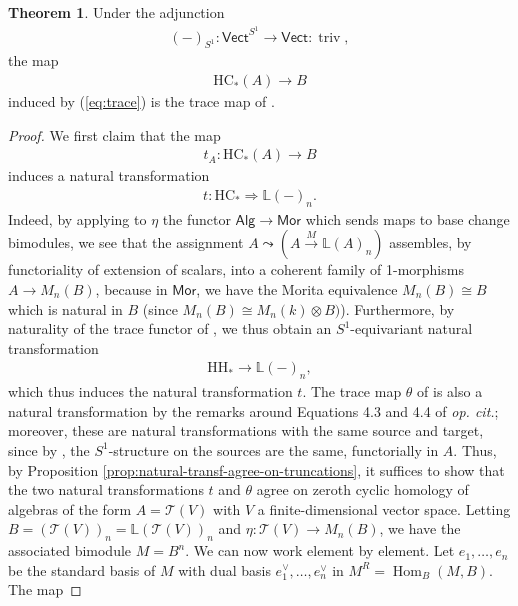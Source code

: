 \documentclass{article}
\numberwithin{equation}{section}
\theoremstyle{quest}
\theoremstyle{definition}
\newtheorem{thm}{Theorem}[section]
\theoremstyle{remark}
\DeclareMathOperator{\Hom}{Hom}
\DeclareMathOperator{\triv}{triv}
\begin{document}
\begin{thm}\label{thm:trace}
	Under the adjunction 
	\begin{align*}
		(-)_{S^1}: \mathsf{Vect}^{S^1}\to \mathsf{Vect}:\triv,
	\end{align*} 
	the map
	\begin{align*}
		\mathrm{HC}_*(A)\to B
	\end{align*} 
	induced by (\ref{eq:trace}) is the trace map of \cite{BKR}.
\end{thm} 
\begin{proof}
	We first claim that the map 
	\begin{align*}
		t_A:\mathrm{HC}_*(A)\to B
	\end{align*} 
	induces a natural transformation
	\begin{align*}
		t:\mathrm{HC}_*\Rightarrow \mathbb{L}(-)_n.
	\end{align*} 
	Indeed, by applying to $\eta$ the functor $\mathsf{Alg}\to \mathsf{Mor}$ which sends maps to base change bimodules, we see that the assignment $A\leadsto (A\xrightarrow{M}\mathbb{L}(A)_n)$ assembles, by functoriality of extension of scalars, into a coherent family of 1-morphisms $A\to M_n(B)$, because in $\mathsf{Mor}$, we have the Morita equivalence $M_n(B)\cong B$ which is natural in $B$ (since $M_n(B)\cong M_n(k)\otimes B)$). Furthermore, by naturality of the  trace functor of \cite[Theorem 2.14]{HSS}, we thus obtain an $S^1$-equivariant natural transformation
	\begin{align*}
		\mathrm H\mathrm H_*\to \mathbb{L}(-)_n,
	\end{align*} 
	which thus induces the natural transformation $t$. The trace map $\theta$ of \cite{BKR} is also a natural transformation by the remarks around Equations 4.3 and 4.4 of \textit{op. cit.}; moreover, these are natural transformations with the same source and target, since by \cite[Proposition 4.24 and Remark 6.12]{HSS}, the $S^1$-structure on the sources are the same, functorially in $A$. Thus, by Proposition \ref{prop:natural-transf-agree-on-truncations}, it suffices to show that the two natural transformations $t$ and $\theta$ agree on zeroth cyclic homology of algebras of the form $A=\mathscr{T}(V)$ with $V$ a finite-dimensional vector space. Letting $B=(\mathscr{T}(V))_n=\mathbb{L}(\mathscr{T}(V))_n$ and $\eta: \mathscr{T}(V)\to M_n(B)$, we have the associated bimodule $M=B^n$. We can now work element by element. Let $e_1,\ldots,e_n$ be the standard basis of $M$ with dual basis $e_1^\vee,\ldots,e_n^\vee$ in $M^R=\Hom_B(M,B)$. The map 

\end{proof}
\end{document}
